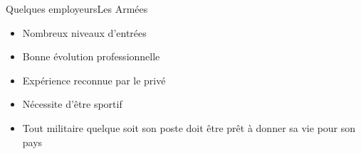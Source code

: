 \documentclass{beamer}
\begin{document}
{ 
\begin{frame}{Quelques employeurs}{Les Armées}

    \begin{itemize}
        \item Nombreux niveaux d'entrées
        \item Bonne évolution professionnelle
        \item Expérience reconnue par le privé
        \item Nécessite d'être sportif
        \item Tout militaire quelque soit son poste doit être prêt à donner sa vie pour son pays
    \end{itemize}
    
\end{frame}
}
\end{document}
